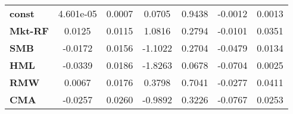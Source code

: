 \begin{center}
\begin{tabular}{lcccccc}
\midrule
\textbf{const}  &     4.601e-05      &       0.0007       &      0.0705     &      0.9438      &      -0.0012      &       0.0013       \\
\textbf{Mkt-RF} &       0.0125       &       0.0115       &      1.0816     &      0.2794      &      -0.0101      &       0.0351       \\
\textbf{SMB}    &      -0.0172       &       0.0156       &     -1.1022     &      0.2704      &      -0.0479      &       0.0134       \\
\textbf{HML}    &      -0.0339       &       0.0186       &     -1.8263     &      0.0678      &      -0.0704      &       0.0025       \\
\textbf{RMW}    &       0.0067       &       0.0176       &      0.3798     &      0.7041      &      -0.0277      &       0.0411       \\
\textbf{CMA}    &      -0.0257       &       0.0260       &     -0.9892     &      0.3226      &      -0.0767      &       0.0253       \\
\bottomrule
\end{tabular}
\end{center}
